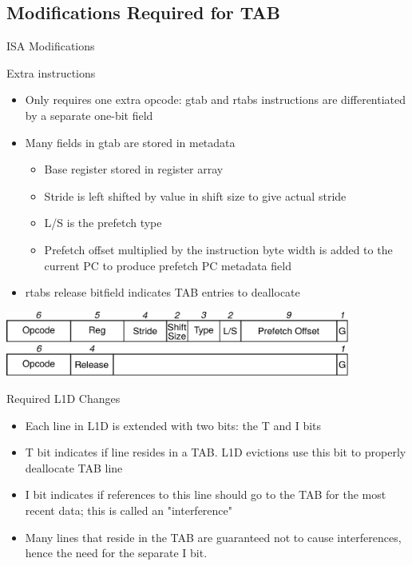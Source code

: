 \documentclass{beamer}
\begin{document}
\subsection{Modifications Required for TAB}
\begin{frame}{ISA Modifications}
   \begin{block}{Extra instructions}
      \begin{itemize}
         \item Only requires one extra opcode: gtab and rtabs instructions
            are differentiated by a separate one-bit field
         \item Many fields in gtab are stored in metadata
            \begin{itemize}
               \item Base register stored in register array
               \item Stride is left shifted by value in shift size to give actual stride
               \item L/S is the prefetch type
               \item Prefetch offset multiplied by the instruction byte width is
                  added to the current PC to produce prefetch PC metadata field
            \end{itemize}
         \item rtabs release bitfield indicates TAB entries to deallocate
      \end{itemize}
   \end{block}
   \begin{center}
      \includegraphics[width=0.85\textwidth]{figures/gtabformat.pdf}\\
      \includegraphics[width=0.85\textwidth]{figures/rtabformat.pdf}
   \end{center}
\end{frame}
\begin{frame}{Required L1D Changes}
   \begin{itemize}
      \item Each line in L1D is extended with two bits: the T and I bits
      \item T bit indicates if line resides in a TAB. L1D evictions use this bit
         to properly deallocate TAB line
      \item I bit indicates if references to this line should go to the TAB for
         the most recent data; this is called an "interference"
      \item Many lines that reside in the TAB are guaranteed not to cause interferences,
         hence the need for the separate I bit.
   \end{itemize}
\end{frame}
\end{document}
